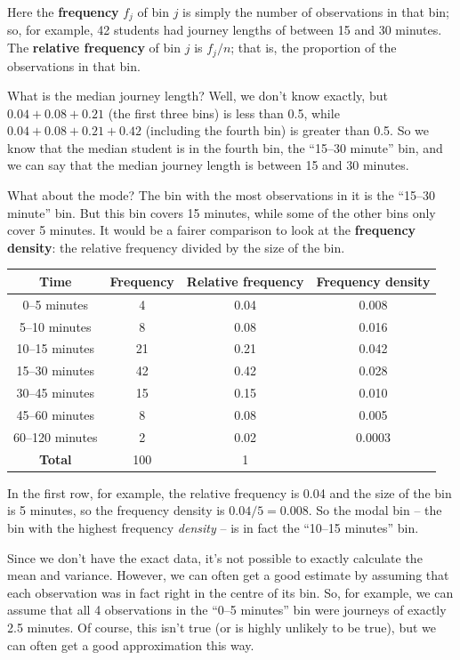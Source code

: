 \documentclass[
  a4paper,
]{book}
\theoremstyle{definition}
\theoremstyle{definition}
\theoremstyle{definition}
\theoremstyle{definition}
\theoremstyle{remark}
\begin{document}
Here the \textbf{frequency} \(f_j\) of bin \(j\) is simply the number of observations in that bin; so, for example, 42 students had journey lengths of between 15 and 30 minutes. The \textbf{relative frequency} of bin \(j\) is \(f_j/n\); that is, the proportion of the observations in that bin.

What is the median journey length? Well, we don't know exactly, but \(0.04 + 0.08 + 0.21\) (the first three bins) is less than 0.5, while \(0.04 + 0.08 + 0.21 + 0.42\) (including the fourth bin) is greater than 0.5. So we know that the median student is in the fourth bin, the ``15--30 minute'' bin, and we can say that the median journey length is between 15 and 30 minutes.

What about the mode? The bin with the most observations in it is the ``15--30 minute'' bin. But this bin covers 15 minutes, while some of the other bins only cover 5 minutes. It would be a fairer comparison to look at the \textbf{frequency density}: the relative frequency divided by the size of the bin.

\begin{longtable}[]{@{}cccc@{}}
\toprule
Time & Frequency & Relative frequency & Frequency density \\
\midrule
\endhead
0--5 minutes & 4 & 0.04 & 0.008 \\
5--10 minutes & 8 & 0.08 & 0.016 \\
10--15 minutes & 21 & 0.21 & 0.042 \\
15--30 minutes & 42 & 0.42 & 0.028 \\
30--45 minutes & 15 & 0.15 & 0.010 \\
45--60 minutes & 8 & 0.08 & 0.005 \\
60--120 minutes & 2 & 0.02 & 0.0003 \\
\textbf{Total} & 100 & 1 & \\
\bottomrule
\end{longtable}

In the first row, for example, the relative frequency is 0.04 and the size of the bin is 5 minutes, so the frequency density is \(0.04/5 = 0.008\). So the modal bin -- the bin with the highest frequency \emph{density} -- is in fact the ``10--15 minutes'' bin.

Since we don't have the exact data, it's not possible to exactly calculate the mean and variance. However, we can often get a good estimate by assuming that each observation was in fact right in the centre of its bin. So, for example, we can assume that all 4 observations in the ``0--5 minutes'' bin were journeys of exactly 2.5 minutes. Of course, this isn't true (or is highly unlikely to be true), but we can often get a good approximation this way.
\end{document}
